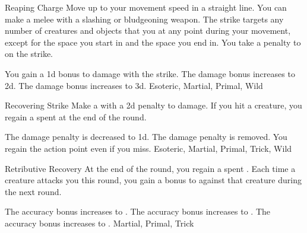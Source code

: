 \lowercase{\hypertarget{maneuver:Reaping Charge}{}}\label{maneuver:Reaping Charge}
\begin{apability}{\hypertarget{maneuver:Reaping Charge}{Reaping Charge}}
Move up to your movement speed in a straight line.
You can make a melee  with a slashing or bludgeoning weapon.
The strike targets any number of creatures and objects that you  at any point during your movement, except for the space you start in and the space you end in.
You take a  penalty to  on the strike.

\rankline
{} You gain a \plus1d bonus to damage with the strike.
 The damage bonus increases to \plus2d.
 The damage bonus increases to \plus3d.
 Esoteric, Martial, Primal, Wild
\end{apability}
\vspace{0.25em}



\lowercase{\hypertarget{maneuver:Recovering Strike}{}}\label{maneuver:Recovering Strike}
\begin{freeability}{\hypertarget{maneuver:Recovering Strike}{Recovering Strike}}
Make a  with a \minus2d penalty to damage.
If you hit a creature, you regain a spent  at the end of the round.

\rankline
{} The damage penalty is decreased to \minus1d.
 The damage penalty is removed.
 You regain the action point even if you miss.
 Esoteric, Martial, Primal, Trick, Wild
\end{freeability}
\vspace{0.25em}



\lowercase{\hypertarget{maneuver:Retributive Recovery}{}}\label{maneuver:Retributive Recovery}
\begin{freeability}{\hypertarget{maneuver:Retributive Recovery}{Retributive Recovery}}
At the end of the round, you regain a spent .
Each time a creature attacks you this round, you gain
a  bonus to  against that creature during the next round.

\rankline
{} The accuracy bonus increases to .
 The accuracy bonus increases to .
 The accuracy bonus increases to .
 Martial, Primal, Trick
\end{freeability}
\vspace{0.25em}



